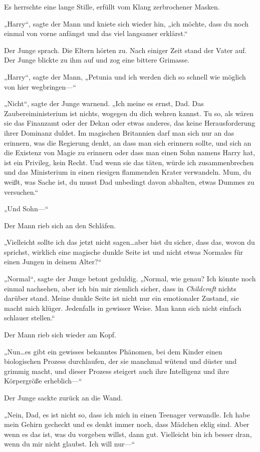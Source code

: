 {Es herrschte eine lange Stille, erfüllt vom Klang zerbrochener Masken.

„Harry“, sagte der Mann und kniete sich wieder hin, „ich möchte, dass du noch einmal von vorne anfängst und das viel langsamer erklärst.“

Der Junge sprach. Die Eltern hörten zu. Nach einiger Zeit stand der Vater auf. Der Junge blickte zu ihm auf und zog eine bittere Grimasse.

„Harry“, sagte der Mann, „Petunia und ich werden dich so schnell wie möglich von hier wegbringen—“

„Nicht“, sagte der Junge warnend. „Ich meine es ernst, Dad. Das Zaubereiministerium ist nichts, wogegen du dich wehren kannst. Tu so, als wären sie das Finanzamt oder der Dekan oder etwas anderes, das keine Herausforderung ihrer Dominanz duldet. Im magischen Britannien darf man sich nur an das erinnern, was die Regierung denkt, an dass man sich erinnern sollte, und sich an die Existenz von Magie zu erinnern oder dass man einen Sohn namens Harry hat, ist ein Privileg, kein Recht. Und wenn sie das täten, würde ich zusammenbrechen und das Ministerium in einen riesigen flammenden Krater verwandeln. Mum, du weißt, was Sache ist, du musst Dad unbedingt davon abhalten, etwas Dummes zu versuchen.“

„Und Sohn—“

Der Mann rieb sich an den Schläfen.

„Vielleicht sollte ich das jetzt nicht sagen…aber bist du sicher, dass das, wovon du sprichst, wirklich eine magische dunkle Seite ist und nicht etwas Normales für einen Jungen in deinem Alter?“

„Normal“, sagte der Junge betont geduldig. „Normal, wie genau? Ich könnte noch einmal nachsehen, aber ich bin mir ziemlich sicher, dass in \emph{Childcraft} nichts darüber stand. Meine dunkle Seite ist nicht nur ein emotionaler Zustand, sie macht mich klüger. Jedenfalls in gewisser Weise. Man kann sich nicht einfach schlauer stellen.“

Der Mann rieb sich wieder am Kopf.

„Nun…es gibt ein gewisses bekanntes Phänomen, bei dem Kinder einen biologischen Prozess durchlaufen, der sie manchmal wütend und düster und grimmig macht, und dieser Prozess steigert auch ihre Intelligenz und ihre Körpergröße erheblich—“

Der Junge sackte zurück an die Wand.

„Nein, Dad, es ist nicht so, dass ich mich in einen Teenager verwandle. Ich habe mein Gehirn gecheckt und es denkt immer noch, dass Mädchen eklig sind. Aber wenn es das ist, was du vorgeben willst, dann gut. Vielleicht bin ich besser dran, wenn du mir nicht glaubst. Ich will nur—“

}
